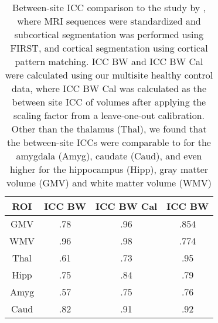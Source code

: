 \begin{table} 
    \begin{tabular}{ c c c c }
        ROI & ICC BW & ICC BW Cal & \cite{cannon2014} ICC BW \\ 
        \midrule
        GMV & .78 & .96 & .854 \\ 
        WMV & .96 & .98 & .774 \\ 
        Thal & .61 & .73 & .95 \\ 
        Hipp & .75 & .84 & .79 \\ 
        Amyg & .57 & .75 & .76 \\ 
        Caud & .82 & .91 & .92 \\ 
        \bottomrule
    \end{tabular} 
    \caption{Between-site ICC comparison to the study by \cite{cannon2014}, where MRI sequences were standardized and subcortical segmentation was performed using FIRST, and cortical segmentation using cortical pattern matching. ICC BW and ICC BW Cal were calculated using our multisite healthy control data, where ICC BW Cal was calculated as the between site ICC of volumes after applying the scaling factor from a leave-one-out calibration. Other than the thalamus (Thal), we found that the between-site ICCs were comparable to \cite{cannon2014} for the amygdala (Amyg), caudate (Caud), and even higher for the hippocampus (Hipp), gray matter volume (GMV) and white matter volume (WMV)} 
\label{comparetocannon}
\end{table}